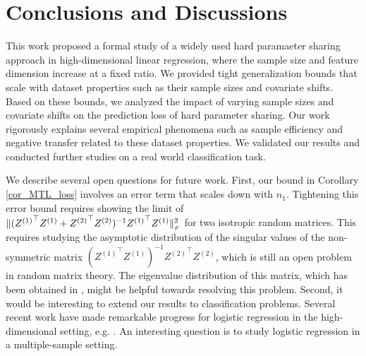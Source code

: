 \section{Conclusions and Discussions}\label{sec_conclude}

This work proposed a formal study of a widely used hard paramaeter sharing approach in high-dimensional linear regression, where the sample size and feature dimension increase at a fixed ratio.
We provided tight generalization bounds that scale with dataset properties such as their sample sizes and covariate shifts.
Based on these bounds, we analyzed the impact of varying sample sizes and covariate shifts on the prediction loss of hard parameter sharing.
Our work rigorously explains several empirical phenomena such as sample efficiency and negative transfer related to these dataset properties.
We validated our results and conducted further studies on a real world classification task.

We describe several open questions for future work.
First, our bound in Corollary \ref{cor_MTL_loss} involves an error term that scales down with $n_1$.
Tightening this error bound requires showing the limit of $\|({Z^{(1)}}^{\top} Z^{(1)} + {Z^{(2)}}^{\top} Z^{(2)})^{-1} {Z^{(1)}}^{\top} Z^{(1)}\|_{_{F}}^2$ for two isotropic random matrices.
This requires studying the asymptotic distribution of the {singular values} of the non-symmetric matrix $({Z^{(1)}}^{\top} Z^{(1)})^{-1}{Z^{(2)}}^{\top} Z^{(2)}$, which is still an open problem in random matrix theory. The eigenvalue distribution of this matrix, which has been obtained in \citet{Fmatrix}, might be helpful towards resolving this problem.
Second, it would be interesting to extend our results to classification problems.
Several recent work have made remarkable progress for logistic regression in the high-dimensional  setting, e.g. \cite{sur2019modern}.
An interesting question is to study logistic regression in a multiple-sample setting.
